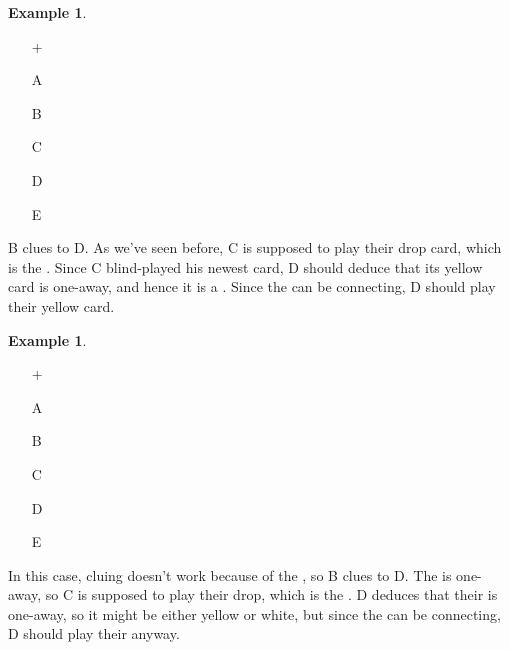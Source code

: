 \documentclass[a4paper]{article}
\theoremstyle{plain}
\theoremstyle{definition}
\newtheorem{example}[theorem]{Example}
\begin{document}
\begin{example}	\hfill \\
	\begin{minipage}{0.45\textwidth}
		\begin{itemize}
			\item[\Large +]      
			\item[\Large A]    
			\item[\Large B]    
			\item[\Large C]    
			\item[\Large D]    
			\item[\Large E]    
		\end{itemize}
	\end{minipage}%
	\begin{minipage}{0.55\textwidth}
		B clues  to D. As we've seen before, C is supposed to play their drop card, which is the . Since C blind-played his newest card, D should deduce that its yellow card is one-away, and hence it is a . Since the  can be connecting, D should play their yellow card.
	\end{minipage}
\end{example} \vspace{0.15 cm}

\begin{example}	\hfill \\
	\begin{minipage}{0.45\textwidth}
		\begin{itemize}
			\item[\Large +]      
			\item[\Large A]    
			\item[\Large B]    
			\item[\Large C]    
			\item[\Large D]    
			\item[\Large E]    
		\end{itemize}
	\end{minipage}%
	\begin{minipage}{0.55\textwidth}
		In this case, cluing  doesn't work because of the , so B clues  to D. The  is one-away, so C is supposed to play their drop, which is the . D deduces that their  is one-away, so it might be either yellow or white, but since the  can be connecting, D should play their  anyway.
	\end{minipage}
\end{example} \vspace{0.15 cm}
\end{document}
